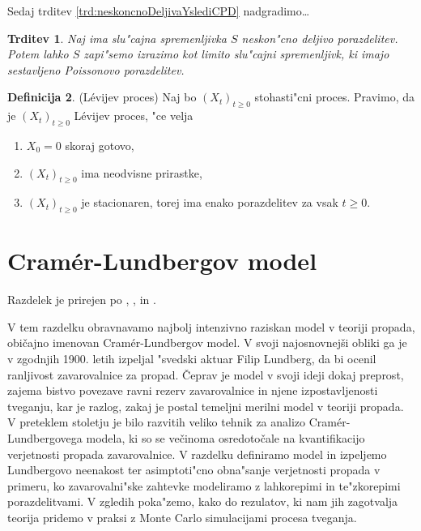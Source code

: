 \documentclass[12pt, a4paper, reqno]{amsart}
\theoremstyle{definition}
\newtheorem{definicija}{Definicija}[section]
\theoremstyle{plain}
\newtheorem{trditev}[definicija]{Trditev}
\newcommand{\1}{\mathds{1}}
\begin{document}
    Sedaj trditev \ref{trd:neskoncnoDeljivaYslediCPD} nadgradimo\dots

    \begin{trditev}
        Naj ima slu"cajna spremenljivka $S$ neskon"cno deljivo porazdelitev. Potem lahko $S$ zapi"semo
        izrazimo kot limito slu"cajni spremenljivk, ki imajo sestavljeno Poissonovo porazdelitev.
    \end{trditev}

    \begin{definicija}
        (Lévijev proces) Naj bo $(X_t)_{t\geq0}$ stohasti"cni proces. Pravimo, da je $(X_t)_{t\geq0}$
        Lévijev proces, "ce velja
        \begin{enumerate}
            \item $X_0 = 0$ skoraj gotovo,
            \item $(X_t)_{t\geq0}$ ima neodvisne prirastke,
            \item $(X_t)_{t\geq0}$ je stacionaren, torej ima enako porazdelitev za vsak $t\geq0$.
        \end{enumerate}

    \end{definicija}
\pagebreak

\section{Cramér-Lundbergov model}
    \noindent
    Razdelek je prirejen po \cite{3}, \cite{4},  \cite{5} in \cite{9}.

    V tem razdelku obravnavamo najbolj intenzivno raziskan model v teoriji propada, običajno imenovan 
    Cramér-Lundbergov model. V svoji najosnovnejši obliki 
    ga je v zgodnjih 1900. letih izpeljal "svedski aktuar Filip Lundberg, da bi ocenil ranljivost 
    zavarovalnice za propad. Čeprav je model v svoji ideji dokaj preprost, 
     zajema bistvo povezave ravni rezerv zavarovalnice in njene izpostavljenosti tveganju, 
    kar je razlog, zakaj je postal temeljni merilni model v teoriji propada.
    V preteklem stoletju je bilo razvitih veliko tehnik za analizo Cramér-Lundbergovega modela, 
    ki so se večinoma osredotočale na kvantifikacijo verjetnosti propada zavarovalnice. V razdelku definiramo 
    model in izpeljemo Lundbergovo neenakost ter asimptoti"cno obna"sanje verjetnosti propada v primeru, ko 
    zavarovalni"ske zahtevke modeliramo z lahkorepimi in te"zkorepimi porazdelitvami. V zgledih 
    poka"zemo, kako do rezulatov, ki nam jih zagotvalja teorija pridemo v praksi z Monte Carlo 
    simulacijami procesa tveganja.
\end{document}
